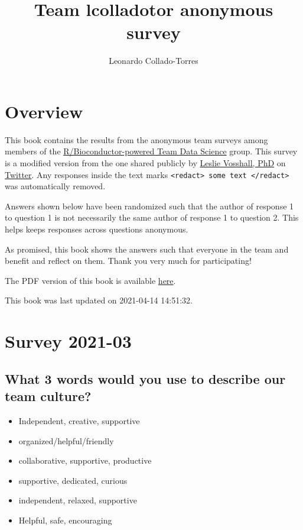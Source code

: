 \documentclass[
]{book}
\title{Team lcolladotor anonymous survey}
\author{Leonardo Collado-Torres}
\date{}
\providecommand{\tightlist}{%
  \setlength{\itemsep}{0pt}\setlength{\parskip}{0pt}}
\begin{document}
\maketitle

{
\setcounter{tocdepth}{1}
\tableofcontents
}
\hypertarget{overview}{%
\chapter*{Overview}\label{overview}}

This book contains the results from the anonymous team surveys among members of the \href{https://lcolladotor.github.io/bioc_team_ds/}{R/Bioconductor-powered Team Data Science} group. This survey is a modified version from the one shared publicly by \href{https://twitter.com/leslievosshall}{Leslie Vosshall, PhD} on \href{https://twitter.com/leslievosshall/status/1371260850657460227?s=20}{Twitter}. Any responses inside the text marks \texttt{\textless{}redact\textgreater{}\ some\ text\ \textless{}/redact\textgreater{}} was automatically removed.

Answers shown below have been randomized such that the author of response 1 to question 1 is not necessarily the same author of response 1 to question 2. This helps keeps responses across questions anonymous.

As promised, this book shows the answers such that everyone in the team and benefit and reflect on them. Thank you very much for participating!

The PDF version of this book is available \href{_main.pdf}{here}.

This book was last updated on 2021-04-14 14:51:32.

\hypertarget{survey-2021-03}{%
\chapter{Survey 2021-03}\label{survey-2021-03}}

\hypertarget{what-3-words-would-you-use-to-describe-our-team-culture}{%
\section{What 3 words would you use to describe our team culture?}\label{what-3-words-would-you-use-to-describe-our-team-culture}}

\begin{itemize}
\tightlist
\item
  Independent, creative, supportive
\item
  organized/helpful/friendly
\item
  collaborative, supportive, productive
\item
  supportive, dedicated, curious
\item
  independent, relaxed, supportive
\item
  Helpful, safe, encouraging
\end{itemize}
\end{document}
